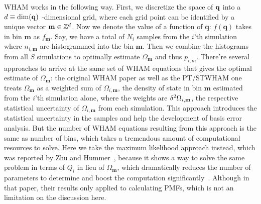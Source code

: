 WHAM works in the following way. First, we discretize the space of $\mathbf{q}$ 
into a $d \equiv \mathrm{dim}(\mathbf{q})$ -dimensional grid, where each grid point can be 
identified by a unique vector $\mathbf{m} \in \mathbb{Z}^{d}$. Now we denote the 
value of a function of $\mathbf{q}$: $f(\mathbf{q})$ takes in bin $\mathbf{m}$ 
as $f_\mathbf{m}$. Say, we have a total of $N_i$ samples from the $i$'th 
simulation where $n_{i,\mathbf{m}}$ are histogrammed into the bin $\mathbf{m}$. 
Then we combine the histograms from all $S$ simulations to optimally estimate 
$\Omega_{\mathbf{m}}$ and thus $p_{i,m}$. There're several approaches to arrive 
at the same set of WHAM equations that gives the optimal estimate of $\Omega_{\mathbf{m}}$: 
the original WHAM paper\cite{Kumar1992} as well as the PT/STWHAM one\cite{Chodera2007} 
treats $\Omega_\mathbf{m}$ as a weighted sum of $\Omega_{i,\mathbf{m}}$, 
the density of state in bin $\mathbf{m}$ estimated from the $i$'th simulation alone, 
where the weights are $\mathrm{\delta}^2 \Omega_{i,\mathbf{m}}$, the respective statistical 
uncertainty of $\Omega_{i,\mathbf{m}}$ from each simulation. This approach introduces
the statistical uncertainty in the samples and help the development of basis error 
analysis. But the number of WHAM equations resulting from this approach is the 
same as number of bins, which takes a tremendous amount of computational resources 
to solve. Here we take the maximum likelihood approach instead, which was reported 
by Zhu and Hummer~\cite{Zhu2012}, because it shows a way to solve the same problem 
in terms of $Q_i$ in lieu of $\Omega_\mathbf{m}$, which dramatically reduces the 
number of parameters to determine and boost the computation significantly~\cite{Zhu2012}.
Although in that paper, their results only applied to calculating PMFs, which is
not an limitation on the discussion here.

